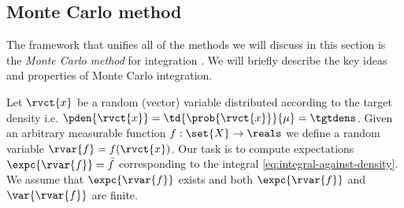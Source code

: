 \subsection{Monte Carlo method}\label{subsec:monte-carlo-method}

The framework that unifies all of the methods we will discuss in this section is the \emph{Monte Carlo method} for integration \citep{ulam1949monte}. We will briefly describe the key ideas and properties of Monte Carlo integration. 

Let $\rvct{x}$ be a random (vector) variable distributed according to the target density i.e. $\pden{\rvct{x}} = \td{\prob{\rvct{x}}}{\mu} = \tgtdens$. Given an arbitrary measurable function $f : \set{X} \to \reals$ we define a random variable $\rvar{f} = f(\rvct{x})$. Our task is to compute expectations $\expc{\rvar{f}} = \bar{f}$ corresponding to the integral \eqref{eq:integral-against-density}. We assume that $\expc{\rvar{f}}$ exists and both $\expc{\rvar{f}}$ and $\var{\rvar{f}}$ are finite.


